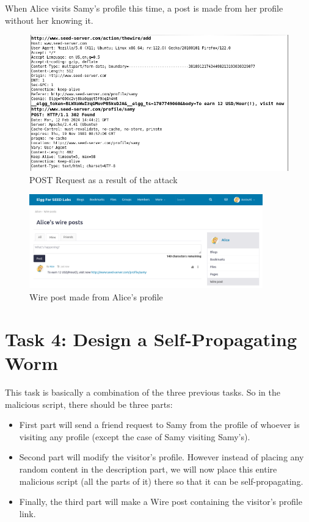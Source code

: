\documentclass[12pt]{article}
\begin{document}
When Alice visits Samy's profile this time, a post is made from her profile without her knowing it.
    \begin{figure}[H]
         \centering
         \includegraphics[width=\textwidth]{Images/ss9.png}
         \caption{POST Request as a result of the attack}
         \label{fig:ss9}
     \end{figure}
    \begin{figure}[H]
         \centering
         \includegraphics[width=0.9\textwidth]{Images/ss5.png}
         \caption{Wire post made from Alice's profile}
         \label{fig:ss5}
     \end{figure}

\newpage

\section*{Task 4: Design a Self-Propagating Worm}
This task is basically a combination of the three previous tasks. So in the malicious script, there should be three parts:
\begin{itemize}
 \item First part will send a friend request to Samy from the profile of whoever is visiting any profile (except the case of Samy visiting Samy's).
 \item Second part will modify the visitor's profile. However instead of placing any random content in the description part, we will now place this entire malicious script (all the parts of it) there so that it can be self-propagating.
 \item Finally, the third part will make a Wire post containing the visitor's profile link.
\end{itemize}
\end{document}
